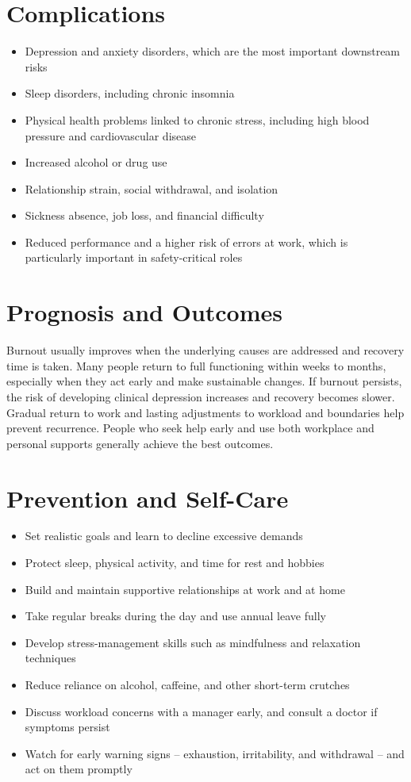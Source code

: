 \section*{Complications}
\begin{itemize}
    \item Depression and anxiety disorders, which are the most important downstream risks
    \item Sleep disorders, including chronic insomnia
    \item Physical health problems linked to chronic stress, including high blood pressure and cardiovascular disease
    \item Increased alcohol or drug use
    \item Relationship strain, social withdrawal, and isolation
    \item Sickness absence, job loss, and financial difficulty
    \item Reduced performance and a higher risk of errors at work, which is particularly important in safety-critical roles
\end{itemize}

\section*{Prognosis and Outcomes}
Burnout usually improves when the underlying causes are addressed and recovery time is taken. Many people return to full functioning within weeks to months, especially when they act early and make sustainable changes. If burnout persists, the risk of developing clinical depression increases and recovery becomes slower. Gradual return to work and lasting adjustments to workload and boundaries help prevent recurrence. People who seek help early and use both workplace and personal supports generally achieve the best outcomes.

\section*{Prevention and Self-Care}
\begin{itemize}
    \item Set realistic goals and learn to decline excessive demands
    \item Protect sleep, physical activity, and time for rest and hobbies
    \item Build and maintain supportive relationships at work and at home
    \item Take regular breaks during the day and use annual leave fully
    \item Develop stress-management skills such as mindfulness and relaxation techniques
    \item Reduce reliance on alcohol, caffeine, and other short-term crutches
    \item Discuss workload concerns with a manager early, and consult a doctor if symptoms persist
    \item Watch for early warning signs -- exhaustion, irritability, and withdrawal -- and act on them promptly
\end{itemize}

